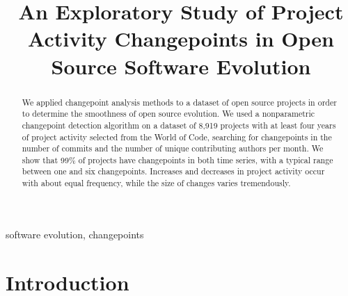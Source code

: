 \documentclass[10pt,conference]{IEEEtran}
\begin{document}
\title{An Exploratory Study of Project Activity Changepoints in Open Source Software Evolution}

\author{
\and
{}
\and
{}
}
\maketitle

\begin{abstract}
We applied changepoint analysis methods to a dataset of open source projects in order to determine the smoothness of open source evolution.
We used a nonparametric changepoint detection algorithm on a dataset of 8,919 projects with at least four years of project activity selected from the World of Code, searching for changepoints in the number of commits and the number of unique contributing authors per month.
We show that 99\% of projects have changepoints in both time series, with a typical range between one and six changepoints. Increases and decreases in project activity occur with about equal frequency, while the size of changes varies tremendously.
\end{abstract}

\begin{IEEEkeywords}
software evolution, changepoints
\end{IEEEkeywords}

\section{Introduction}
\end{document}
